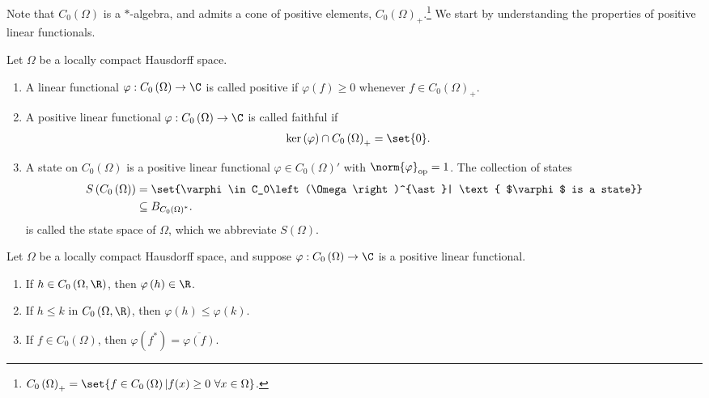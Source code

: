 \documentclass[10pt]{mypackage}
\begin{document}
Note that $C_0\left(\Omega\right)$ is a $\ast$-algebra, and admits a cone of positive elements, $C_0\left(\Omega\right)_{+}$.\footnote{$C_0\left(\Omega\right)_{+} = \set{f\in C_0\left(\Omega\right)| f(x)\geq 0~\forall x\in \Omega}$.} We start by understanding the properties of positive linear functionals.
\begin{definition}
  Let $\Omega$ be a locally compact Hausdorff space.
  \begin{enumerate}[(1)]
    \item A linear functional $\varphi: C_0\left(\Omega\right)\rightarrow \C$ is called positive if $\varphi(f) \geq 0$ whenever $f\in C_0\left(\Omega\right)_{+}$.
    \item A positive linear functional $\varphi: C_0\left(\Omega\right)\rightarrow \C$ is called faithful if
      \begin{align*}
        \ker\left(\varphi\right)\cap C_0\left(\Omega\right)_{+} &= \set{0}.
      \end{align*}
    \item A state on $C_0\left(\Omega\right)$ is a positive linear functional $\varphi\in C_0\left(\Omega\right)'$ with $\norm{\varphi}_{\text{op}} = 1$. The collection of states
      \begin{align*}
        S\left(C_0\left(\Omega\right)\right) &= \set{\varphi\in C_0\left(\Omega\right)^{\ast}| \text{ $\varphi$ is a state}}\\
                                             &\subseteq B_{C_{0}\left(\Omega\right)^{\ast}}.
      \end{align*}
      is called the state space of $\Omega$, which we abbreviate $S\left(\Omega\right)$.
  \end{enumerate}
\end{definition}
\begin{lemma}
  Let $\Omega$ be a locally compact Hausdorff space, and suppose $\varphi: C_0\left(\Omega\right)\rightarrow \C$ is a positive linear functional.
  \begin{enumerate}[(1)]
    \item If $h\in C_0\left(\Omega,\R\right)$, then $\varphi\left(h\right)\in \R$.
    \item If $h\leq k$ in $C_0\left(\Omega,\R\right)$, then $\varphi\left(h\right) \leq \varphi\left(k\right)$.
    \item If $f\in C_0\left(\Omega\right)$, then $\varphi\left(f^{\ast}\right) = \overline{\varphi\left(f\right)}$.
  \end{enumerate}
\end{lemma}
\end{document}
